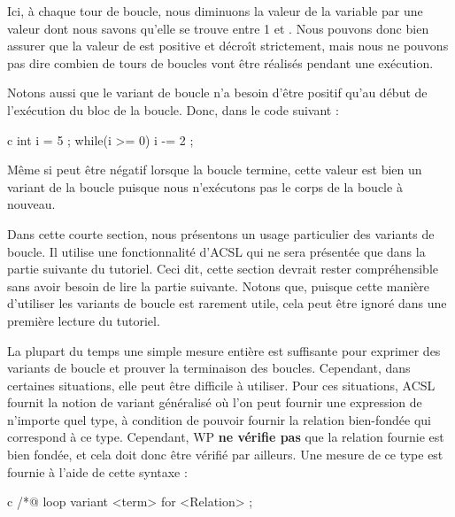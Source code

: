 

Ici, à chaque tour de boucle, nous diminuons la valeur de la variable
 par une valeur dont nous savons qu'elle se trouve entre 1 et
. Nous pouvons donc bien assurer que la valeur de 
est positive et décroît strictement, mais nous ne pouvons pas dire combien de
tours de boucles vont être réalisés pendant une exécution.


Notons aussi que le variant de boucle n'a besoin d'être positif qu'au début de
l'exécution du bloc de la boucle. Donc, dans le code suivant :


\begin{CodeBlock}{c}
int i = 5 ;
while(i >= 0){
  i -= 2 ;
}
\end{CodeBlock}


Même si  peut être négatif lorsque la boucle termine, cette valeur
est bien un variant de la boucle puisque nous n'exécutons pas le corps de la
boucle à nouveau.


\label{l4:statements-loops-general-measure}


\begin{Information}
  Dans cette courte section, nous présentons un usage particulier des variants
  de boucle. Il utilise une fonctionnalité d'ACSL qui ne sera présentée que dans
  la partie suivante du tutoriel. Ceci dit, cette section devrait rester
  compréhensible sans avoir besoin de lire la partie suivante. Notons que,
  puisque cette manière d'utiliser les variants de boucle est rarement utile,
  cela peut être ignoré dans une première lecture du tutoriel.
\end{Information}


La plupart du temps une simple mesure entière est suffisante pour exprimer des
variants de boucle et prouver la terminaison des boucles. Cependant, dans
certaines situations, elle peut être difficile à utiliser. Pour ces situations,
ACSL fournit la notion de variant généralisé où l'on peut fournir une expression
de n'importe quel type, à condition de pouvoir fournir la relation bien-fondée
qui correspond à ce type. Cependant, WP \textbf{ne vérifie pas} que la relation
fournie est bien fondée, et cela doit donc être vérifié par ailleurs. Une mesure
de ce type est fournie à l'aide de cette syntaxe :


\begin{CodeBlock}{c}
/*@ loop variant <term> for <Relation> ;
\end{CodeBlock}


